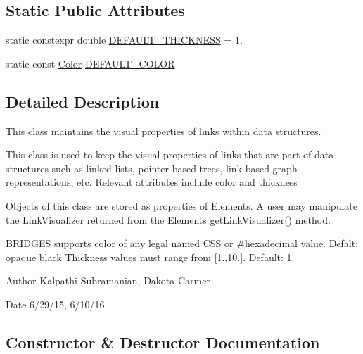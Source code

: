 \subsection*{Static Public Attributes}
\begin{DoxyCompactItemize}
\item 
static constexpr double \mbox{\hyperlink{classbridges_1_1_link_visualizer_ab790c33080c769008114db34d5ec8950}{D\+E\+F\+A\+U\+L\+T\+\_\+\+T\+H\+I\+C\+K\+N\+E\+SS}} = 1.
\item 
static const \mbox{\hyperlink{classbridges_1_1_color}{Color}} \mbox{\hyperlink{classbridges_1_1_link_visualizer_a7698ad5b243041377d81152a339d1282}{D\+E\+F\+A\+U\+L\+T\+\_\+\+C\+O\+L\+OR}}
\end{DoxyCompactItemize}


\subsection{Detailed Description}
This class maintains the visual properties of links within data structures. 

This class is used to keep the visual properties of links that are part of data structures such as linked lists, pointer based trees, link based graph representations, etc. Relevant attributes include color and thickness

Objects of this class are stored as properties of Elements. A user may manipulate the \mbox{\hyperlink{classbridges_1_1_link_visualizer}{Link\+Visualizer}} returned from the \mbox{\hyperlink{classbridges_1_1_element}{Element}}\textquotesingle{}s get\+Link\+Visualizer() method.

B\+R\+I\+D\+G\+ES supports color of any legal named C\+SS or \#hexadecimal value. Defalt\+: opaque black Thickness values must range from \mbox{[}1.,10.\mbox{]}. Default\+: 1.

\begin{DoxyAuthor}{Author}
Kalpathi Subramanian, Dakota Carmer 
\end{DoxyAuthor}
\begin{DoxyDate}{Date}
6/29/15, 6/10/16 
\end{DoxyDate}


\subsection{Constructor \& Destructor Documentation}
\mbox{\label{classbridges_1_1_link_visualizer_a598a773822efc55c644462795faf534f}} 
